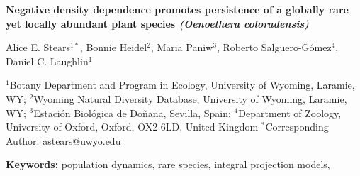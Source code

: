 \documentclass[12pt, letterpaper]{article}
\begin{document}
\begin{flushleft}
\textbf{Negative density dependence promotes persistence of a globally rare yet locally abundant plant species \textit{(Oenoethera coloradensis)}}

\normalsize{Alice E. Stears$^{1*}$, Bonnie Heidel$^2$, Maria Paniw$^3$, Roberto Salguero-Gómez$^4$, Daniel C. Laughlin$^1$}

\small{$^1$Botany Department and Program in Ecology, University of Wyoming, Laramie, WY; \linebreak
$^2$Wyoming Natural Diversity Database, University of Wyoming, Laramie, WY; \linebreak
$^3$Estación Biológica de Doñana, Sevilla, Spain; \linebreak
$^4$Department of Zoology, University of Oxford, Oxford, OX2 6LD, United Kingdom}\linebreak
\small{$^*$Corresponding Author: astears@uwyo.edu}


\end{flushleft}
\textbf{Keywords:} population dynamics, rare species, integral projection models, 
\end{document}
